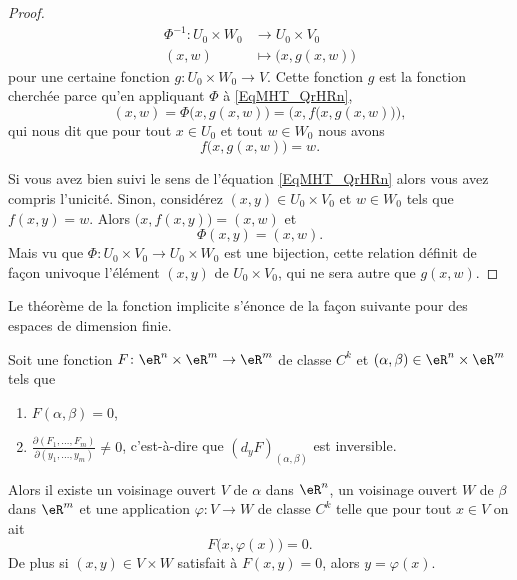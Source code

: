 \begin{proof}
\begin{equation}
\begin{aligned}
            \Phi^{-1}\colon U_0\times W_0 & \to U_0\times V_0         \\
                              (x,w)       & \mapsto \big( x,g(x,w) \big)
        \end{aligned}
    \end{equation}
    pour une certaine fonction \( g\colon U_0\times W_0\to V\). Cette fonction \( g\) est la fonction cherchée parce qu'en appliquant \( \Phi\) à \eqref{EqMHT_QrHRn},
    \begin{equation}
        (x,w)=\Phi\big( x,g(x,w) \big)=\Big( x,f\big( x,g(x,w) \big) \Big),
    \end{equation}
    qui nous dit que pour tout \( x\in U_0\) et tout \( w\in W_0\) nous avons
    \begin{equation}
        f\big( x,g(x,w) \big)=w.
    \end{equation}

    Si vous avez bien suivi le sens de l'équation \eqref{EqMHT_QrHRn} alors vous avez compris l'unicité. Sinon, considérez \( (x,y)\in U_0\times V_0\) et \( w\in W_0\) tels que \( f(x,y)=w\). Alors \( \big( x,f(x,y) \big)=(x,w)\) et
    \begin{equation}
        \Phi(x,y)=(x,w).
    \end{equation}
    Mais vu que \( \Phi\colon U_0\times V_0\to U_0\times W_0\) est une bijection, cette relation définit de façon univoque l'élément \( (x,y)\) de \( U_0\times V_0\), qui ne sera autre que \( g(x,w)\).
\end{proof}

Le théorème de la fonction implicite s'énonce de la façon suivante pour des espaces de dimension finie.
\begin{theorem}   \label{ThoRYN_jvZrZ}
    Soit une fonction \( F\colon \eR^n\times \eR^m\to \eR^m\) de classe \( C^k\) et \( (\alpha,\beta)\in \eR^n\times \eR^m\) tels que
    \begin{enumerate}
        \item
            \( F(\alpha,\beta)=0\),
        \item
            \( \frac{ \partial (F_1,\ldots, F_m) }{ \partial (y_1,\ldots, y_m) }\neq 0\), c'est-à-dire que \( (d_yF)_{(\alpha,\beta)} \) est inversible.
    \end{enumerate}
    Alors il existe un voisinage ouvert \( V\) de \( \alpha\) dans \( \eR^n\), un voisinage ouvert \( W\) de \( \beta\) dans \( \eR^m\) et une application \( \varphi\colon V\to W\) de classe \( C^k\)  telle que pour tout \( x\in V\) on ait
    \begin{equation}
        F\big( x,\varphi(x) \big)=0.
    \end{equation}
    De plus si \( (x,y)\in V\times W\) satisfait à \( F(x,y)=0\), alors \( y=\varphi(x)\).
\end{theorem}

